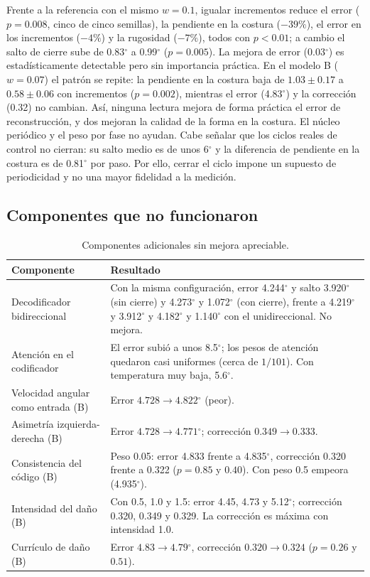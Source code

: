 \documentclass[11pt,a4paper]{amsart}
\newcommand{\gr}{$^{\circ}$}
\begin{document}
Frente a la referencia con el mismo $w=0.1$, igualar incrementos reduce el error ($p=0.008$, cinco de cinco semillas), la pendiente en la costura ($-39\%$), el error en los incrementos ($-4\%$) y la rugosidad ($-7\%$), todos con $p<0.01$; a cambio el salto de cierre sube de 0.83\gr{} a 0.99\gr{} ($p=0.005$). La mejora de error (0.03\gr) es estadísticamente detectable pero sin importancia práctica. En el modelo B ($w=0.07$) el patrón se repite: la pendiente en la costura baja de $1.03\pm0.17$ a $0.58\pm0.06$ con incrementos ($p=0.002$), mientras el error (4.83\gr) y la corrección (0.32) no cambian. Así, ninguna lectura mejora de forma práctica el error de reconstrucción, y dos mejoran la calidad de la forma en la costura. El núcleo periódico y el peso por fase no ayudan. Cabe señalar que los ciclos reales de control no cierran: su salto medio es de unos 6\gr{} y la diferencia de pendiente en la costura es de 0.81\gr{} por paso. Por ello, cerrar el ciclo impone un supuesto de periodicidad y no una mayor fidelidad a la medición.

\subsection{Componentes que no funcionaron}
\label{sec:negativos}

\begin{table}[h]
\centering\footnotesize
\begin{tabularx}{\textwidth}{@{}>{\raggedright\arraybackslash}p{3.3cm}>{\raggedright\arraybackslash}X@{}}
\toprule
Componente & Resultado \\
\midrule
Decodificador bidireccional & Con la misma configuración, error 4.244\gr{} y salto 3.920\gr{} (sin cierre) y 4.273\gr{} y 1.072\gr{} (con cierre), frente a 4.219\gr{} y 3.912\gr{} y 4.182\gr{} y 1.140\gr{} con el unidireccional. No mejora. \\
Atención en el codificador & El error subió a unos 8.5\gr{}; los pesos de atención quedaron casi uniformes (cerca de $1/101$). Con temperatura muy baja, 5.6\gr{}. \\
Velocidad angular como entrada (B) & Error $4.728\to4.822$\gr{} (peor). \\
Asimetría izquierda-derecha (B) & Error $4.728\to4.771$\gr{}; corrección $0.349\to0.333$. \\
Consistencia del código (B) & Peso 0.05: error 4.833 frente a 4.835\gr{}, corrección 0.320 frente a 0.322 ($p=0.85$ y $0.40$). Con peso 0.5 empeora (4.935\gr). \\
Intensidad del daño (B) & Con 0.5, 1.0 y 1.5: error 4.45, 4.73 y 5.12\gr{}; corrección 0.320, 0.349 y 0.329. La corrección es máxima con intensidad 1.0. \\
Currículo de daño (B) & Error $4.83\to4.79$\gr{}, corrección $0.320\to0.324$ ($p=0.26$ y $0.51$). \\
\bottomrule
\end{tabularx}
\caption{Componentes adicionales sin mejora apreciable.}
\label{tab:neg}
\end{table}
\end{document}
